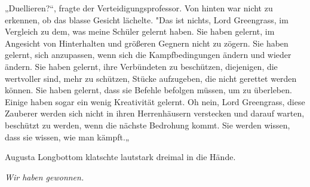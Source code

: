 „Duellieren?“, fragte der Verteidigungsprofessor. Von hinten war nicht zu erkennen, ob das blasse Gesicht lächelte. "Das ist nichts, Lord Greengrass, im Vergleich zu dem, was meine Schüler gelernt haben. Sie haben gelernt, im Angesicht von Hinterhalten und größeren Gegnern nicht zu zögern. Sie haben gelernt, sich anzupassen, wenn sich die Kampfbedingungen ändern und wieder ändern. Sie haben gelernt, ihre Verbündeten zu beschützen, diejenigen, die wertvoller sind, mehr zu schützen, Stücke aufzugeben, die nicht gerettet werden können. Sie haben gelernt, dass sie Befehle befolgen müssen, um zu überleben. Einige haben sogar ein wenig Kreativität gelernt. Oh nein, Lord Greengrass, diese Zauberer werden sich nicht in ihren Herrenhäusern verstecken und darauf warten, beschützt zu werden, wenn die nächste Bedrohung kommt. Sie werden wissen, dass sie wissen, wie man kämpft.„

Augusta Longbottom klatschte lautstark dreimal in die Hände.

\later

\emph{Wir haben gewonnen.}

